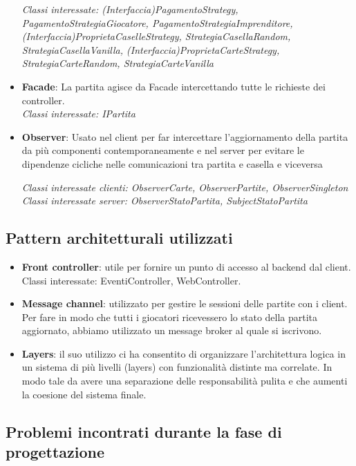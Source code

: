 \documentclass{article}
\begin{document}
\begin{itemize}
         \textit{Classi interessate: (Interfaccia)PagamentoStrategy, PagamentoStrategiaGiocatore, PagamentoStrategiaImprenditore, (Interfaccia)ProprietaCaselleStrategy, StrategiaCasellaRandom, StrategiaCasellaVanilla, (Interfaccia)ProprietaCarteStrategy, StrategiaCarteRandom, StrategiaCarteVanilla}
         
         
         \item \textbf{Facade}: La partita agisce da Facade intercettando tutte le richieste dei controller. \\
         \textit{Classi interessate: IPartita}
         
         
         \item \textbf{Observer}: Usato nel client per far intercettare l’aggiornamento della partita da più componenti contemporaneamente e nel server per evitare le dipendenze cicliche nelle comunicazioni tra partita e casella e viceversa
         
         \textit{Classi interessate clienti: ObserverCarte, ObserverPartite, ObserverSingleton}
         \textit{Classi interessate server: ObserverStatoPartita, SubjectStatoPartita}

         
    \end{itemize}

\subsection{Pattern architetturali utilizzati}
    \begin{itemize}
        \item \textbf{Front controller}: utile per fornire un punto di accesso al backend dal client. Classi interessate: EventiController, WebController.
        \item \textbf{Message channel}: utilizzato per gestire le sessioni delle partite con i client. Per fare in modo che tutti i giocatori ricevessero lo stato della partita aggiornato, abbiamo utilizzato un message broker al quale si iscrivono.
        \item \textbf{Layers}: il suo utilizzo ci ha consentito di organizzare l’architettura logica in un sistema di più livelli (layers) con funzionalità distinte ma correlate. In modo tale da avere una separazione delle responsabilità pulita e che aumenti la coesione del sistema finale.
    \end{itemize}
    



\subsection{Problemi incontrati durante la fase di progettazione}
\end{document}
